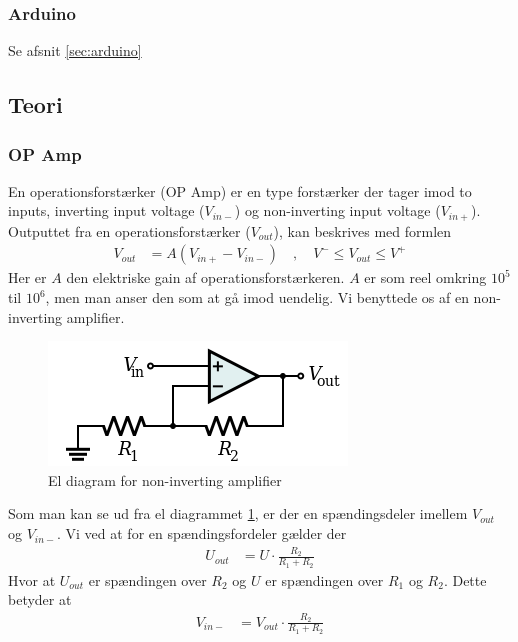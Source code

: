 \subsubsection{Arduino}
Se afsnit \ref{sec:arduino} 

\subsection{Teori}
\subsubsection{OP Amp}\label{sec:OPAMP}

En operationsforstærker (OP Amp) er en type forstærker der tager imod to inputs, inverting input voltage ($V_{in-}$) og non-inverting input voltage ($V_{in+}$). Outputtet fra en operationsforstærker  ($V_{out}$), kan beskrives med formlen
\begin{align}
V_{out}&=A(V_{in+}-V_{in-})\quad,\quad V^- \leq V_{out}\leq V^+ 
\end{align}
Her er $A$ den elektriske gain af operationsforstærkeren. $A$ er som reel omkring $10^5$ til $10^6$, men man anser den som at gå imod uendelig. Vi benyttede os af en non-inverting amplifier. 
\begin{figure}[H]
	\centering
    \includegraphics[width=\textwidth]{figures/komponenter/NonInvAmp}
	\caption{El diagram for non-inverting amplifier}
	\label{fig:noninvamp}	
\end{figure}
Som man kan se ud fra el diagrammet \ref{fig:noninvamp}, er der en spændingsdeler imellem $V_{out}$ og $V_{in-}$. Vi ved at for en spændingsfordeler gælder der
\begin{align}
U_{out}&=U\cdot \frac{R_2}{R_1+R_2}
\end{align}
Hvor at $U_{out}$ er spændingen over $R_2$ og $U$ er spændingen over $R_1$ og $R_2$.
Dette betyder at
\begin{align}
V_{in-}&=V_{out}\cdot \frac{R_2}{R_1+R_2}
\end{align}
